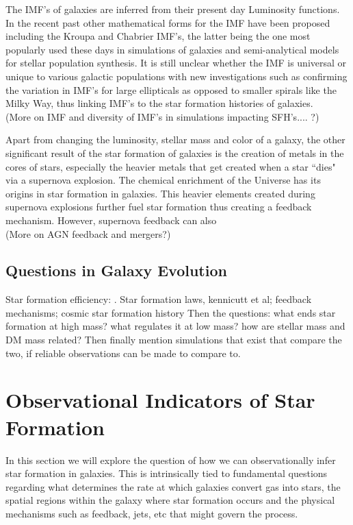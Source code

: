 The IMF's of galaxies are inferred from their present day Luminosity functions. In the recent past other mathematical forms for the IMF have been proposed including the Kroupa \citep{2001MNRAS.322..231K} and Chabrier \citep{2003PASP..115..763C} IMF's, the latter being the one most popularly used these days in simulations of galaxies and semi-analytical models for stellar population synthesis. It is still unclear whether the IMF is universal or unique to various galactic populations with  new investigations such as \citet{2012Natur.484..485C} confirming the variation in IMF's for large ellipticals as opposed to smaller spirals like the Milky Way, thus linking IMF's to the star formation histories of galaxies.\\

(More on IMF and diversity of IMF's in simulations impacting SFH's.... ?)

Apart from changing the luminosity, stellar mass and color of a galaxy, the other significant result of the star formation of galaxies is the creation of metals in the cores of stars, especially the heavier metals that get created when a star ``dies" via a supernova explosion. The chemical enrichment of the Universe has its origins in star formation in galaxies. This heavier elements created during supernova explosions further fuel star formation thus creating a feedback mechanism. However, supernova feedback can also \\ 
(More on AGN feedback and mergers?)

\subsection{Questions in Galaxy Evolution}
Star formation efficiency: \citep{1538-3881-136-6-2782}.
Star formation laws, kennicutt et al; feedback mechanisms; cosmic star formation history
{Then the questions: what ends star formation at high mass?
what regulates it at low mass? how are 
stellar mass and DM mass related? Then finally mention
simulations that exist that compare the two, if reliable
observations can be made to compare to.}

\section{Observational Indicators of Star Formation}

In this section we will explore the question of how we can observationally infer star formation in galaxies. This is intrinsically tied to fundamental questions regarding what determines the rate at which galaxies convert gas into stars, the spatial regions within the galaxy where star formation occurs and the physical mechanisms such as feedback, jets, etc that might govern the process. 

